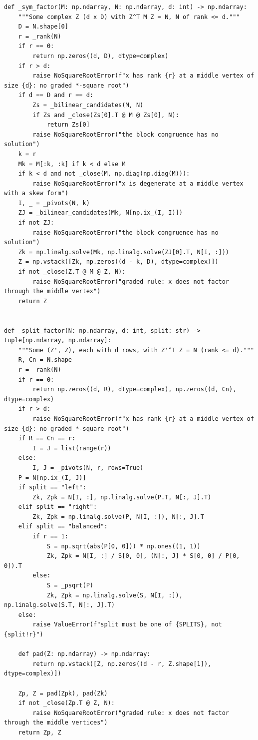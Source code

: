 \documentclass[12pt, a4paper]{report}
\theoremstyle{plain}
\theoremstyle{definition}
\theoremstyle{remark}
\theoremstyle{plain}
\begin{document}
\begin{lstlisting}[style=dsqcode]
def _sym_factor(M: np.ndarray, N: np.ndarray, d: int) -> np.ndarray:
    """Some complex Z (d x D) with Z^T M Z = N, N of rank <= d."""
    D = N.shape[0]
    r = _rank(N)
    if r == 0:
        return np.zeros((d, D), dtype=complex)
    if r > d:
        raise NoSquareRootError(f"x has rank {r} at a middle vertex of size {d}: no graded *-square root")
    if d == D and r == d:
        Zs = _bilinear_candidates(M, N)
        if Zs and _close(Zs[0].T @ M @ Zs[0], N):
            return Zs[0]
        raise NoSquareRootError("the block congruence has no solution")
    k = r
    Mk = M[:k, :k] if k < d else M
    if k < d and not _close(M, np.diag(np.diag(M))):
        raise NoSquareRootError("x is degenerate at a middle vertex with a skew form")
    I, _ = _pivots(N, k)
    ZJ = _bilinear_candidates(Mk, N[np.ix_(I, I)])
    if not ZJ:
        raise NoSquareRootError("the block congruence has no solution")
    Zk = np.linalg.solve(Mk, np.linalg.solve(ZJ[0].T, N[I, :]))
    Z = np.vstack([Zk, np.zeros((d - k, D), dtype=complex)])
    if not _close(Z.T @ M @ Z, N):
        raise NoSquareRootError("graded rule: x does not factor through the middle vertex")
    return Z


def _split_factor(N: np.ndarray, d: int, split: str) -> tuple[np.ndarray, np.ndarray]:
    """Some (Z', Z), each with d rows, with Z'^T Z = N (rank <= d)."""
    R, Cn = N.shape
    r = _rank(N)
    if r == 0:
        return np.zeros((d, R), dtype=complex), np.zeros((d, Cn), dtype=complex)
    if r > d:
        raise NoSquareRootError(f"x has rank {r} at a middle vertex of size {d}: no graded *-square root")
    if R == Cn == r:
        I = J = list(range(r))
    else:
        I, J = _pivots(N, r, rows=True)
    P = N[np.ix_(I, J)]
    if split == "left":
        Zk, Zpk = N[I, :], np.linalg.solve(P.T, N[:, J].T)
    elif split == "right":
        Zk, Zpk = np.linalg.solve(P, N[I, :]), N[:, J].T
    elif split == "balanced":
        if r == 1:
            S = np.sqrt(abs(P[0, 0])) * np.ones((1, 1))
            Zk, Zpk = N[I, :] / S[0, 0], (N[:, J] * S[0, 0] / P[0, 0]).T
        else:
            S = _psqrt(P)
            Zk, Zpk = np.linalg.solve(S, N[I, :]), np.linalg.solve(S.T, N[:, J].T)
    else:
        raise ValueError(f"split must be one of {SPLITS}, not {split!r}")

    def pad(Z: np.ndarray) -> np.ndarray:
        return np.vstack([Z, np.zeros((d - r, Z.shape[1]), dtype=complex)])

    Zp, Z = pad(Zpk), pad(Zk)
    if not _close(Zp.T @ Z, N):
        raise NoSquareRootError("graded rule: x does not factor through the middle vertices")
    return Zp, Z



\end{lstlisting}
\end{document}
